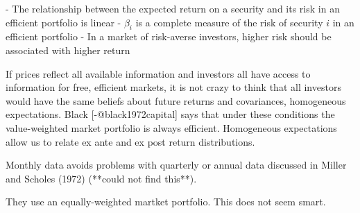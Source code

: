 - The relationship between the expected return on a security and its risk in an efficient portfolio is linear
- $\beta_i$ is a complete measure of the risk of security $i$ in an efficient portfolio
- In a market of risk-averse investors, higher risk should be associated with higher return

If prices reflect all available information and investors all have access to information for free, efficient markets, it is not crazy to think that all investors would have the same beliefs about future returns and covariances, homogeneous expectations.
Black [-@black1972capital] says that under these conditions the value-weighted market portfolio is always efficient.
Homogeneous expectations allow us to relate ex ante and ex post return distributions.

Monthly data avoids problems with quarterly or annual data discussed in Miller and Scholes (1972) (**could not find this**).

They use an equally-weighted martket portfolio.
This does not seem smart.


